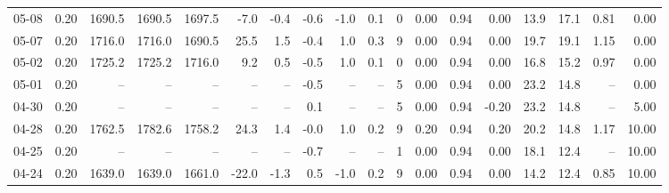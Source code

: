 \begin{threeparttable}
{\begin{tabular}{lrrrrrrrrrrrrrrrrr}
  05-08 &     0.20 & 1690.5 & 1690.5 & 1697.5 &       -7.0 &           -0.4 &                      -0.6 &                     -1.0 &                 0.1 &              0 &       0.00 &      0.94 &           0.00 &             13.9 &                17.1 &            0.81 &                   0.00 \\
  05-07 &     0.20 & 1716.0 & 1716.0 & 1690.5 &       25.5 &            1.5 &                      -0.4 &                      1.0 &                 0.3 &              9 &       0.00 &      0.94 &           0.00 &             19.7 &                19.1 &            1.15 &                   0.00 \\
  05-02 &     0.20 & 1725.2 & 1725.2 & 1716.0 &        9.2 &            0.5 &                      -0.5 &                      1.0 &                 0.1 &              0 &       0.00 &      0.94 &           0.00 &             16.8 &                15.2 &            0.97 &                   0.00 \\
  05-01 &     0.20 &     -- &     -- &     -- &         -- &             -- &                      -0.5 &                       -- &                  -- &              5 &       0.00 &      0.94 &           0.00 &             23.2 &                14.8 &              -- &                   0.00 \\
  04-30 &     0.20 &     -- &     -- &     -- &         -- &             -- &                       0.1 &                       -- &                  -- &              5 &       0.00 &      0.94 &          -0.20 &             23.2 &                14.8 &              -- &                   5.00 \\
  04-28 &     0.20 & 1762.5 & 1782.6 & 1758.2 &       24.3 &            1.4 &                      -0.0 &                      1.0 &                 0.2 &              9 &       0.20 &      0.94 &           0.20 &             20.2 &                14.8 &            1.17 &                  10.00 \\
  04-25 &     0.20 &     -- &     -- &     -- &         -- &             -- &                      -0.7 &                       -- &                  -- &              1 &       0.00 &      0.94 &           0.00 &             18.1 &                12.4 &              -- &                  10.00 \\
  04-24 &     0.20 & 1639.0 & 1639.0 & 1661.0 &      -22.0 &           -1.3 &                       0.5 &                     -1.0 &                 0.2 &              9 &       0.00 &      0.94 &           0.00 &             14.2 &                12.4 &            0.85 &                  10.00 \\

\end{tabular}}
\end{threeparttable}
